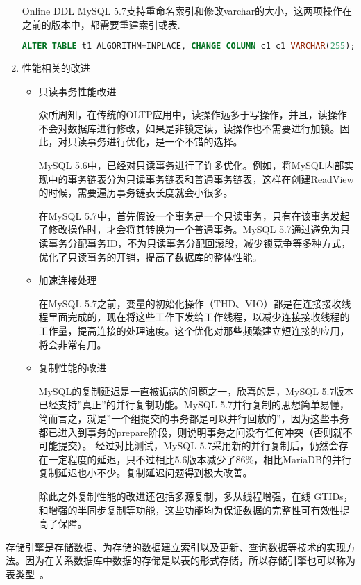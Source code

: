 \begin{enumerate}
Online DDL MySQL 5.7支持重命名索引和修改varchar的大小，这两项操作在之前的版本中，都需要重建索引或表.
\begin{lstlisting}[language=sql,numbers=none]
ALTER TABLE t1 ALGORITHM=INPLACE, CHANGE COLUMN c1 c1 VARCHAR(255);
\end{lstlisting}

\item 性能相关的改进
\begin{itemize}
\item 只读事务性能改进

众所周知，在传统的OLTP应用中，读操作远多于写操作，并且，读操作不会对数据库进行修改，如果是非锁定读，读操作也不需要进行加锁。因此，对只读事务进行优化，是一个不错的选择。

MySQL 5.6中，已经对只读事务进行了许多优化。例如，将MySQL内部实现中的事务链表分为只读事务链表和普通事务链表，这样在创建ReadView的时候，需要遍历事务链表长度就会小很多。

在MySQL 5.7中，首先假设一个事务是一个只读事务，只有在该事务发起了修改操作时，才会将其转换为一个普通事务。MySQL 5.7通过避免为只读事务分配事务ID，不为只读事务分配回滚段，减少锁竞争等多种方式，优化了只读事务的开销，提高了数据库的整体性能。
\item 加速连接处理

在MySQL 5.7之前，变量的初始化操作（THD、VIO）都是在连接接收线程里面完成的，现在将这些工作下发给工作线程，以减少连接接收线程的工作量，提高连接的处理速度。这个优化对那些频繁建立短连接的应用，将会非常有用。
\item 复制性能的改进

MySQL的复制延迟是一直被诟病的问题之一，欣喜的是，MySQL 5.7版本已经支持”真正”的并行复制功能。MySQL 5.7并行复制的思想简单易懂，简而言之，就是”一个组提交的事务都是可以并行回放的”，因为这些事务都已进入到事务的prepare阶段，则说明事务之间没有任何冲突（否则就不可能提交）。 经过对比测试，MySQL 5.7采用新的并行复制后，仍然会存在一定程度的延迟，只不过相比5.6版本减少了86\%，相比MariaDB的并行复制延迟也小不少。复制延迟问题得到极大改善。

除此之外复制性能的改进还包括多源复制，多从线程增强，在线 GTIDs，和增强的半同步复制等功能，这些功能均为保证数据的完整性可有效性提高了保障。
\end{itemize}
\end{enumerate}

存储引擎是存储数据、为存储的数据建立索引以及更新、查询数据等技术的实现方法。因为在关系数据库中数据的存储是以表的形式存储，所以存储引擎也可以称为表类型~\cite{胡雯2012mysql}。

